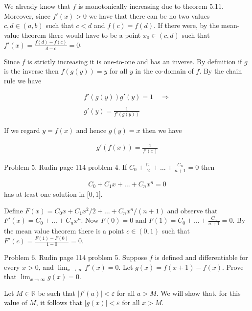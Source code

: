\documentclass{article}
\begin{document}
  \vspace{1cm}

  We already know that $f$ is monotonically increasing due to theorem 5.11.  Moreover, since $f'(x) >0$ we have that there can be no two values $c,d\in (a,b)$ such that $c < d$ and $f(c)=f(d)$.  If there were, by the mean-value theorem there would have to be a point $x_0\in (c,d)$ such that $f'(x) = \frac{f(d)-f(c)}{d-c} = 0$.

  Since $f$ is strictly increasing it is one-to-one and has an inverse.  By definition if $g$ is the inverse then $f(g(y)) = y$ for all $y$ in the co-domain of $f$.  By the chain rule we have

  \begin{align*}
    f'(g(y))g'(y) = 1 \quad \Rightarrow\\\\
    g'(y) = \frac{1}{f'(g(y))}
  \end{align*}

  If we regard $y = f(x)$ and hence $g(y) = x$ then we have

  \begin{align*}
    g'(f(x)) = \frac{1}{f'(x)}
  \end{align*}

  \pagebreak

  {\Large \color{Sepia} Problem 5. Rudin page 114 problem 4. If $C_0+\frac{C_1}{2}+\dots+\frac{C_n}{n+1}=0$ then

  \begin{align*}
    C_0+C_1x+\dots+C_nx^n = 0
  \end{align*}
  has at least one solution in [$0,1$].
  }

  \vspace{1cm}

  Define $F(x) = C_0x + C_1x^2/2 + \dots + C_nx^n/(n+1)$ and observe that $F'(x) = C_0+\dots+C_nx^n$.  Now $F(0)=0$ and $F(1)=C_0+\dots+\frac{C_n}{n+1}=0$.  By the mean value theorem there is a point $c\in (0,1)$ such that $F'(c) = \frac{F(1)-F(0)}{1-0} = 0$.

  \pagebreak

  {\Large \color{Sepia} Problem 6. Rudin page 114 problem 5. Suppose $f$ is defined and differentiable for every $x>0$, and $\displaystyle\lim_{x\to \infty}f'(x) = 0$.  Let $g(x)=f(x+1)-f(x)$.  Prove that $\lim_{x\to \infty}g(x)=0$.}

  \vspace{1cm}

  Let $M\in\mathbb R$ be such that $|f'(a)|<\varepsilon$ for all $a>M$.  We will show that, for this value of $M$, it follows that $|g(x)|<\varepsilon$ for all $x>M$.
\end{document}
